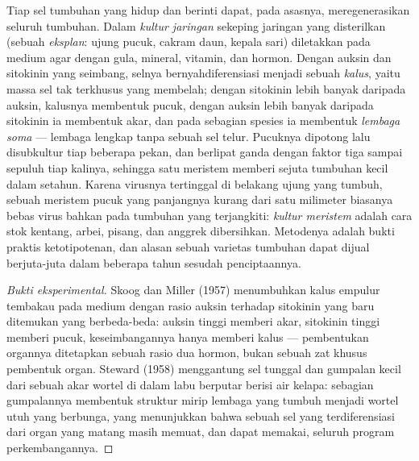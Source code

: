 \begin{proposition}\label{prop:b2:asexual-reproduction:tissueculture}
Tiap sel tumbuhan yang hidup dan berinti dapat, pada asasnya,
meregenerasikan seluruh tumbuhan. Dalam \emph{kultur jaringan}
sekeping jaringan yang disterilkan (sebuah \emph{eksplan}: ujung
pucuk, cakram daun, kepala sari) diletakkan pada medium agar dengan
gula, mineral, vitamin, dan hormon. Dengan auksin dan sitokinin yang
seimbang, selnya bernyahdiferensiasi menjadi sebuah \emph{kalus}, yaitu
massa sel tak terkhusus yang membelah; dengan sitokinin lebih banyak
daripada auksin, kalusnya membentuk pucuk, dengan auksin lebih banyak
daripada sitokinin ia membentuk akar, dan pada sebagian spesies ia
membentuk \emph{lembaga soma} --- lembaga lengkap tanpa sebuah sel
telur. Pucuknya dipotong lalu disubkultur tiap beberapa pekan, dan
berlipat ganda dengan faktor tiga sampai sepuluh tiap kalinya, sehingga
satu meristem memberi sejuta tumbuhan kecil dalam setahun. Karena
virusnya tertinggal di belakang ujung yang tumbuh, sebuah meristem
pucuk yang panjangnya kurang dari satu milimeter biasanya bebas virus
bahkan pada tumbuhan yang terjangkiti: \emph{kultur meristem} adalah
cara stok kentang, arbei, pisang, dan anggrek dibersihkan. Metodenya
adalah bukti praktis ketotipotenan, dan alasan sebuah varietas tumbuhan
dapat dijual berjuta-juta dalam beberapa tahun sesudah penciptaannya.
\end{proposition}
\begin{proof}[Bukti eksperimental]
Skoog dan Miller (1957) menumbuhkan kalus empulur tembakau pada medium
dengan rasio auksin terhadap sitokinin yang baru ditemukan yang
berbeda-beda: auksin tinggi memberi akar, sitokinin tinggi memberi
pucuk, keseimbangannya hanya memberi kalus --- pembentukan organnya
ditetapkan sebuah rasio dua hormon, bukan sebuah zat khusus pembentuk
organ. Steward (1958) menggantung sel tunggal dan gumpalan kecil dari
sebuah akar wortel di dalam labu berputar berisi air kelapa: sebagian
gumpalannya membentuk struktur mirip lembaga yang tumbuh menjadi wortel
utuh yang berbunga, yang menunjukkan bahwa sebuah sel yang
terdiferensiasi dari organ yang matang masih memuat, dan dapat memakai,
seluruh program perkembangannya.
\end{proof}

